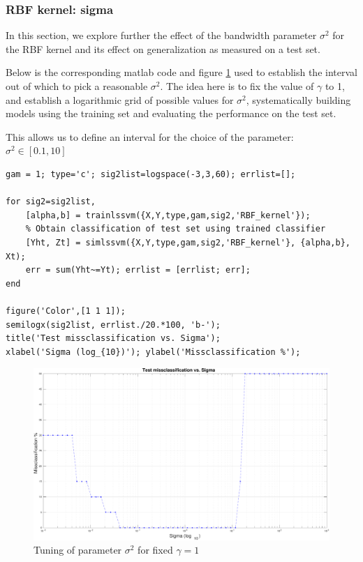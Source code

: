 \documentclass[11pt, a4paper]{article}
\begin{document}
\subsubsection{RBF kernel: sigma}

In this section, we explore further the effect of the bandwidth
parameter $\sigma^2$ for the RBF kernel and its effect on
generalization as measured on a test set.

Below is the corresponding matlab code and figure \ref{fig:rbf_sigma}
used to establish the interval out of which to pick a reasonable
$\sigma^2$. The idea here is to fix the value of $\gamma$ to 1, and
establish a logarithmic grid of possible values for $\sigma^2$,
systematically building models using the training set and evaluating
the performance on the test set.

This allows us to define an interval for the choice of the parameter:
$\sigma^2 \in [0.1,10]$

\begin{lstlisting}
gam = 1; type='c'; sig2list=logspace(-3,3,60); errlist=[];

for sig2=sig2list,
    [alpha,b] = trainlssvm({X,Y,type,gam,sig2,'RBF_kernel'});
    % Obtain classification of test set using trained classifier
    [Yht, Zt] = simlssvm({X,Y,type,gam,sig2,'RBF_kernel'}, {alpha,b}, Xt);
    err = sum(Yht~=Yt); errlist = [errlist; err]; 
end

figure('Color',[1 1 1]);
semilogx(sig2list, errlist./20.*100, 'b-');
title('Test missclassification vs. Sigma');
xlabel('Sigma (log_{10})'); ylabel('Missclassification %');
\end{lstlisting}

\begin{figure}[H]
    \centering
    \includegraphics[scale=.40]{rbf_sigma.pdf}
    \caption{Tuning of parameter $\sigma^2$ for fixed $\gamma=1$}
    \label{fig:rbf_sigma}
\end{figure}
\end{document}
